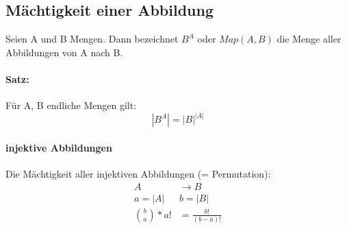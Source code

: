 \subsection{Mächtigkeit einer Abbildung}
Seien A und B Mengen.
Dann bezeichnet $B^A$ oder $Map(A,B)$ die Menge aller Abbildungen von A nach B.
\paragraph*{Satz:}
Für A, B endliche Mengen gilt:
$$ |B^A| = {|B|}^{|A|} $$

\paragraph*{injektive Abbildungen}
Die Mächtigkeit aller injektiven Abbildungen (= Permutation):
\begin{align*}
  A &\rightarrow B \\
  a = |A| \; &b = |B| \\
  {{b}\choose{a}} * a!
  &= \frac{b!}{(b-a)!}
\end{align*}